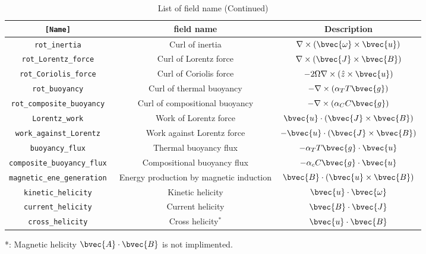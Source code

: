 \begin{table}[htp]
\caption{List of field name (Continued)}
\begin{center}
\begin{tabular}{|c|c|c|}
\hline
\tt [Name] & field name & Description \\ \hline \hline
\tt rot\_inertia & Curl of inertia &  $ \nabla \times \left(\bvec{\omega} \times \bvec{u}\right) $ \\
\tt rot\_Lorentz\_force & Curl of Lorentz force &  $ \nabla \times \left(\bvec{J} \times \bvec{B}\right) $ \\
\tt rot\_Coriolis\_force & Curl of Coriolis force &  $ -2 \Omega \nabla \times \left(\hat{z} \times \bvec{u} \right) $ \\
\tt rot\_buoyancy                   & Curl of thermal buoyancy &  $ - \nabla \times \left(\alpha_{T} T \bvec{g}\right)  $ \\
\tt rot\_composite\_buoyancy & Curl of compositional buoyancy &  $ - \nabla \times \left(\alpha_{C} C\bvec{g}\right)  $\\
\hline
\tt Lorentz\_work & Work of Lorentz force
 & $\bvec{u}\cdot \left( \bvec{J} \times \bvec{B} \right) $ \\ 
\tt work\_against\_Lorentz & Work against Lorentz force
 & $- \bvec{u}\cdot \left( \bvec{J} \times \bvec{B} \right) $ \\ 
\tt buoyancy\_flux & Thermal buoyancy flux & $ -\alpha_{T} T \bvec{g} \cdot \bvec{u} $ \\
\tt composite\_buoyancy\_flux & Compositional buoyancy flux & $ -\alpha_{c} C \bvec{g} \cdot \bvec{u} $ \\
\tt magnetic\_ene\_generation & Energy production by magnetic induction
 & $  \bvec{B} \cdot \left( \bvec{u} \times \bvec{B} \right) $ \\ 
\hline
\tt kinetic\_helicity & Kinetic helicity & $  \bvec{u} \cdot \bvec{\omega} $ \\
\tt current\_helicity & Current helicity & $  \bvec{B} \cdot \bvec{J} $ \\
\tt cross\_helicity & Cross helicity$^{*}$ & $  \bvec{u} \cdot \bvec{B} $ \\
\hline
\end{tabular}
\end{center}
*: Magnetic helicity $\bvec{A} \cdot \bvec{B} $ is not implimented.
\label{table:fields2}
\end{table}
%
